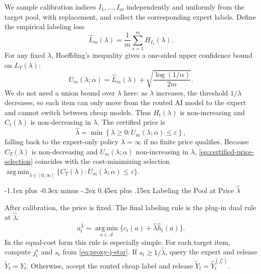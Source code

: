 \documentclass[11pt]{article}
\makeatletter
\renewcommand\subsection{\@startsection{subsection}{2}{\z@}%
  {-1.1ex plus -0.3ex minus -.2ex}%
  {0.45ex plus .15ex}%
  {\normalfont\large\bfseries}}
\newcommand{\calA}{\mathcal{A}}
\newcommand{\hatY}{\widehat Y}
\newcommand{\tildeY}{\widetilde Y}
\newcommand{\hath}{\widehat h}
\newcommand{\hatL}{\widehat L}
\newcommand{\eps}{\varepsilon}
\newcommand{\argmin}{\operatorname*{arg\,min}}
\makeatother
\begin{document}
We sample calibration indices \(I_1,\ldots,I_m\) independently and uniformly
from the target pool, with replacement, and collect the corresponding expert
labels. Define the empirical
labeling loss
\begin{equation}
    \hatL_m(\lambda)
    =
    \frac1m\sum_{s=1}^m H_{I_s}(\lambda).
    \label{eq:empirical-cal-loss}
\end{equation}
For any fixed \(\lambda\), Hoeffding's inequality gives a one-sided upper
confidence bound on \(L_T(\lambda)\):
\begin{equation}
    U_m(\lambda;\alpha)
    =
    \hatL_m(\lambda)
    +
    \sqrt{\frac{\log(1/\alpha)}{2m}}.
    \label{eq:hoeffding-ucb}
\end{equation}
We do not need a union bound over \(\lambda\) here: as \(\lambda\) increases,
the threshold \(1/\lambda\) decreases, so each item can only move from the
routed AI model to the expert and cannot switch between cheap models. Thus
\(H_t(\lambda)\) is non-increasing and \(C_t(\lambda)\) is non-decreasing in
\(\lambda\).
The certified price is
\begin{equation}
    \hat\lambda
    =
    \min\left\{\lambda\ge0 : U_m(\lambda;\alpha)\le\eps\right\},
    \label{eq:certified-price-selection}
\end{equation}
falling back to the expert-only policy $\lambda=\infty$ if no finite price
qualifies. Because $C_T(\lambda)$ is non-decreasing and $U_m(\lambda;\alpha)$
non-increasing in $\lambda$, \eqref{eq:certified-price-selection} coincides with
the cost-minimizing selection
$\argmin_{\lambda\in[0,\infty]}\{C_T(\lambda):U_m(\lambda;\alpha)\le\eps\}$.

\subsection{Labeling the Pool at Price \texorpdfstring{$\hat\lambda$}{lambda-hat}}
\label{sec:proxy-estimation}

After calibration, the price is fixed. The final labeling rule is the plug-in
dual rule at \(\hat\lambda\):
\[
    a_t^{\hat\lambda}
    =
    \argmin_{a\in\calA}
    \{c_t(a)+\hat\lambda\hath_t(a)\}.
\]
In the equal-cost form this rule is especially simple. For each target item,
compute \(j_t^\star\) and \(s_t\) from \eqref{eq:proxy-j-star}. If
\(s_t\ge1/\hat\lambda\), query the expert and release \(\tildeY_t=Y_t\).
Otherwise, accept the routed cheap label and release
\(\tildeY_t=\hatY_t^{(j_t^\star)}\).
\end{document}
